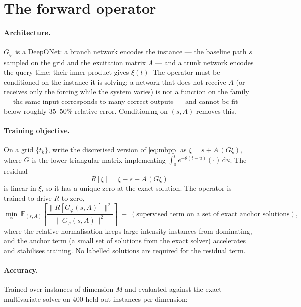 \documentclass[11pt]{article}
\begin{document}
\section{The forward operator}
\label{sec:operator}

\paragraph{Architecture.} $G_\varphi$ is a DeepONet: a branch network encodes the
instance --- the baseline path $s$ sampled on the grid and the excitation matrix $A$ ---
and a trunk network encodes the query time; their inner product gives $\xi(t)$. The
operator must be conditioned on the instance it is solving: a network that does not
receive $A$ (or receives only the forcing while the system varies) is not a function on
the family --- the same input corresponds to many correct outputs --- and cannot be
fit below roughly $35$--$50\%$ relative error. Conditioning on $(s,A)$ removes this.

\paragraph{Training objective.} On a grid $\{t_k\}$, write the discretised version of
\eqref{eq:mbpp} as $\xi = s + A\,(G\xi)$, where $G$ is the lower-triangular matrix
implementing $\int_0^t e^{-\theta(t-u)}(\cdot)\,\mathrm{d}u$. The residual
\begin{equation}
R[\xi] = \xi - s - A\,(G\xi)
\label{eq:residual}
\end{equation}
is linear in $\xi$, so it has a unique zero at the exact solution. The operator is
trained to drive $R$ to zero,
\begin{equation}
\min_\varphi\ \mathbb{E}_{(s,A)}\!\left[\frac{\lVert R[G_\varphi(s,A)]\rVert^2}{\lVert
G_\varphi(s,A)\rVert^2}\right] \;+\; (\text{supervised term on a set of exact anchor
solutions}),
\label{eq:trainloss}
\end{equation}
where the relative normalisation keeps large-intensity instances from dominating, and
the anchor term (a small set of solutions from the exact solver) accelerates and
stabilises training. No labelled solutions are required for the residual term.

\paragraph{Accuracy.} Trained over instances of dimension $M$ and evaluated against the
exact multivariate solver on $400$ held-out instances per dimension:
\end{document}
